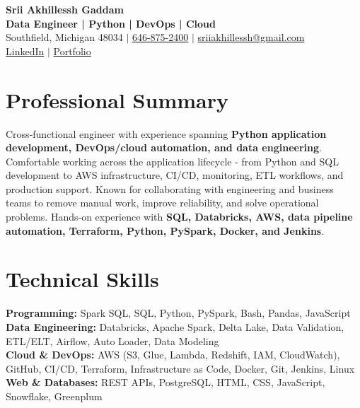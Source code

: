 \documentclass[letterpaper,10pt]{article}
\begin{document}
\fontsize{9.35pt}{10.45pt}\selectfont

\begin{center}
    {\LARGE \textbf{Srii Akhillessh Gaddam}} \\[-1pt]
    \textbf{Data Engineer | Python | DevOps | Cloud} \\[2pt]
    Southfield, Michigan 48034 $|$
    \href{tel:6468752400}{646-875-2400} $|$
    \href{mailto:sriiakhillessh@gmail.com}{sriiakhillessh@gmail.com} \\[1pt]
    \href{https://www.linkedin.com/in/srii-akhiilessh-gaddam-b48668191/}{LinkedIn} $|$
    \href{https://sriiakhillesshg.github.io/portfolio/}{Portfolio}
\end{center}
\vspace{-8pt}

\section{Professional Summary}
\small{Cross-functional engineer with experience spanning \textbf{Python application development, DevOps/cloud automation, and data engineering}. Comfortable working across the application lifecycle - from Python and SQL development to AWS infrastructure, CI/CD, monitoring, ETL workflows, and production support. Known for collaborating with engineering and business teams to remove manual work, improve reliability, and solve operational problems. Hands-on experience with \textbf{SQL, Databricks, AWS, data pipeline automation, Terraform, Python, PySpark, Docker, and Jenkins}.}

\section{Technical Skills}
\small{
\textbf{Programming:} Spark SQL, SQL, Python, PySpark, Bash, Pandas, JavaScript \\
\textbf{Data Engineering:} Databricks, Apache Spark, Delta Lake, Data Validation, ETL/ELT, Airflow, Auto Loader, Data Modeling \\
\textbf{Cloud \& DevOps:} AWS (S3, Glue, Lambda, Redshift, IAM, CloudWatch), GitHub, CI/CD, Terraform, Infrastructure as Code, Docker, Git, Jenkins, Linux \\
\textbf{Web \& Databases:} REST APIs, PostgreSQL, HTML, CSS, JavaScript, Snowflake, Greenplum
}
\end{document}
